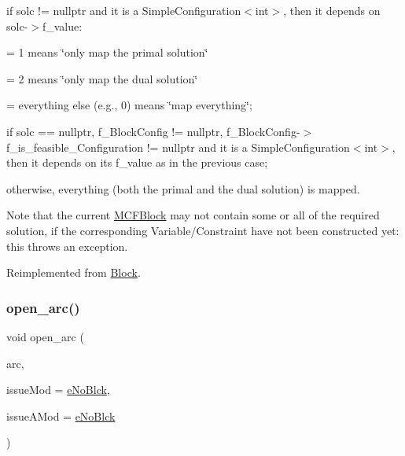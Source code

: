 \begin{DoxyItemize}
\item if solc != nullptr and it is a Simple\+Configuration$<$int$>$, then it depends on solc-\/$>$f\+\_\+value\+:

= 1 means \char`\"{}only map the primal solution\char`\"{}

= 2 means \char`\"{}only map the dual solution\char`\"{}

= everything else (e.\+g., 0) means \char`\"{}map everything\char`\"{};
\item if solc == nullptr, f\+\_\+\+Block\+Config != nullptr, f\+\_\+\+Block\+Config-\/$>$f\+\_\+is\+\_\+feasible\+\_\+\+Configuration != nullptr and it is a Simple\+Configuration$<$int$>$, then it depends on its f\+\_\+value as in the previous case;
\item otherwise, everything (both the primal and the dual solution) is mapped.
\end{DoxyItemize}

Note that the current \mbox{\hyperlink{class_s_m_spp__di__unipi__it_1_1_m_c_f_block}{M\+C\+F\+Block}} may not contain some or all of the required solution, if the corresponding Variable/\+Constraint have not been constructed yet\+: this throws an exception. 

Reimplemented from \mbox{\hyperlink{class_s_m_spp__di__unipi__it_1_1_block_a7759467d70613a10c1cdb5d3193b4434}{Block}}.

\mbox{\label{class_s_m_spp__di__unipi__it_1_1_m_c_f_block_abb7152054e9d24040576c5b0ef0c264e}} 
\subsubsection{\texorpdfstring{open\+\_\+arc()}{open\_arc()}}
{\footnotesize\ttfamily void open\+\_\+arc (\begin{DoxyParamCaption}\item[{\mbox{\hyperlink{class_s_m_spp__di__unipi__it_1_1_m_c_f_block_aee6156e2ce80720d57a082d80f39d8cc}{c\+\_\+\+Index}}}]{arc,  }\item[{\mbox{\hyperlink{group___modification___t_y_p_e_s_ga544246d8c462e9a2d817c2c30797968f}{c\+\_\+\+Mod\+Param}}}]{issue\+Mod = {\ttfamily \mbox{\hyperlink{group___modification___t_y_p_e_s_gga48fddcdd03a03f49b7e389ca1ed938d4ada69e89c5f46e563d8a13cfa6830c136}{e\+No\+Blck}}},  }\item[{\mbox{\hyperlink{group___modification___t_y_p_e_s_ga544246d8c462e9a2d817c2c30797968f}{c\+\_\+\+Mod\+Param}}}]{issue\+A\+Mod = {\ttfamily \mbox{\hyperlink{group___modification___t_y_p_e_s_gga48fddcdd03a03f49b7e389ca1ed938d4ada69e89c5f46e563d8a13cfa6830c136}{e\+No\+Blck}}} }\end{DoxyParamCaption})}



